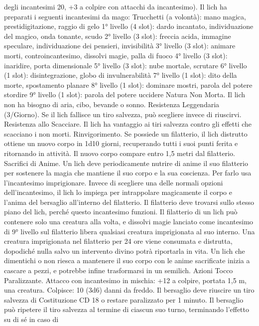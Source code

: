 \begin{multicols}{2}
degli incantesimi 20, +3 a colpire con attacchi da incantesimo). Il
lich ha preparati i seguenti incantesimi da mago:
Trucchetti (a volontà): mano magica, prestidigitazione, raggio
di gelo
1° livello (4 slot): dardo incantato, individuazione del magico,
onda tonante, scudo
2° livello (3 slot): freccia acida, immagine speculare,
individuazione dei pensieri, invisibilità
3° livello (3 slot): animare morti, controincantesimo, dissolvi
magie, palla di fuoco
4° livello (3 slot): inaridire, porta dimensionale
5° livello (3 slot): nube mortale, scrutare
6° livello (1 slot): disintegrazione, globo di invulnerabilità
7° livello (1 slot): dito della morte, spostamento planare
8° livello (1 slot): dominare mostri, parola del potere stordire
9° livello (1 slot): parola del potere uccidere
Natura Non Morta. Il lich non ha bisogno di aria, cibo, bevande
o sonno.
Resistenza Leggendaria (3/Giorno). Se il lich fallisce un tiro
salvezza, può scegliere invece di riuscirvi.
Resistenza allo Scacciare. Il lich ha vantaggio ai tiri salvezza
contro gli effetti che scacciano i non morti.
Rinvigorimento. Se possiede un filatterio, il lich distrutto ottiene
un nuovo corpo in 1d10 giorni, recuperando tutti i suoi punti
ferita e ritornando in attività. Il nuovo corpo compare entro 1,5
metri dal filatterio.
Sacrifici di Anime. Un lich deve periodicamente nutrire di anime
il suo filatterio per sostenere la magia che mantiene il suo corpo
e la sua coscienza. Per farlo usa l’incantesimo imprigionare.
Invece di scegliere una delle normali opzioni dell’incantesimo, il
lich lo impiega per intrappolare magicamente il corpo e l’anima
del bersaglio all’interno del filatterio. Il filatterio deve trovarsi
sullo stesso piano del lich, perché questo incantesimo funzioni. Il
filatterio di un lich può contenere solo una creatura alla volta, e
dissolvi magie lanciato come incantesimo di 9° livello sul
filatterio libera qualsiasi creatura imprigionata al suo interno.
Una creatura imprigionata nel filatterio per 24 ore viene
consumata e distrutta, dopodiché nulla salvo un intervento divino
potrà riportarla in vita.
Un lich che dimentichi o non riesca a mantenere il suo corpo con
le anime sacrificate inizia a cascare a pezzi, e potrebbe infine
trasformarsi in un semilich.
Azioni
Tocco Paralizzante. Attacco con incantesimo in mischia: +12 a
colpire, portata 1,5 m, una creatura.
Colpisce: 10 (3d6) danni da freddo. Il bersaglio deve riuscire un
tiro salvezza di Costituzione CD 18 o restare paralizzato per 1
minuto. Il bersaglio può ripetere il tiro salvezza al termine di
ciascun suo turno, terminando l’effetto su di sé in caso di

\end{multicols}

